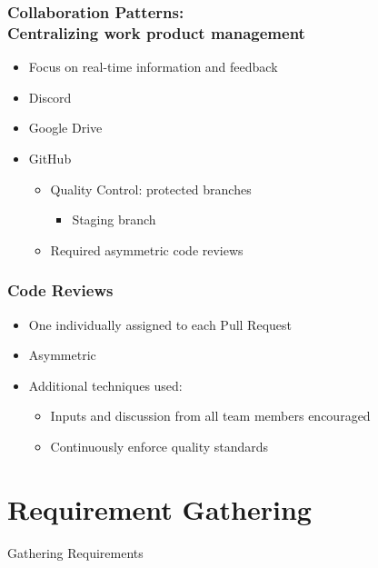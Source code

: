 \documentclass{beamer}
\begin{document}
\begin{frame}
\frametitle{Collaboration Patterns: \\ Centralizing work product management}
\begin{itemize}
 \item Focus on real-time information and feedback
 \item Discord
 \item Google Drive
 \item GitHub
  \begin{itemize}
   \item Quality Control: protected branches
     \begin{itemize}
        \item Staging branch
    \end{itemize}
   \item Required asymmetric code reviews
  \end{itemize}
\end{itemize}
\end{frame}


\begin{frame}
\frametitle{Code Reviews}
 \begin{itemize}
  \item One individually assigned to each Pull Request
  \item Asymmetric
  \item Additional techniques used:
   \begin{itemize}
    \item Inputs and discussion from all team members encouraged
    \item Continuously enforce quality standards
   \end{itemize}
\end{itemize}
\end{frame}



\section{Requirement Gathering}

\begin{frame}
\begin{center}
\Huge Gathering Requirements
\end{center}
\end{frame}
\end{document}
